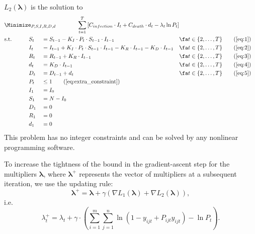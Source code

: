\documentclass{article}
\begin{document}
\begin{minipage}{\linewidth}
{
    $L_2(\bm{\lambda})$ is the solution to\\
    \small
    \begin{alignat}{4}
        &\Minimize_{P,S,I,R,D,d}\qquad \span\span\span\span\span \sum_{t=1}^{T}\left[C_{infection}\cdot I_t + C_{death} \cdot d_t -\lambda_t \ln P_t\right]\nonumber\\
        & \text{s.t.} \qquad&& S_t &&= S_{t-1} - K_I \cdot P_t \cdot S_{t-1} \cdot I_{t-1} && \fa t \in \{2,\ldots,T\} \tag{\ref{eq:1}}\\
        & {} && I_t &&= I_{t-1} + K_I \cdot P_t \cdot S_{t-1} \cdot I_{t-1} - K_R\cdot I_{t-1} - K_D \cdot I_{t-1} && \fa t \in \{2,\ldots,T\} \tag{\ref{eq:2}}\\
        & {} && R_t &&= R_{t-1} + K_R \cdot I_{t-1} && \fa t \in \{2,\ldots,T\} \tag{\ref{eq:3}}\\
        & {} && d_t &&= K_D \cdot I_{t-1} && \fa t \in \{2,\ldots,T\} \tag{\ref{eq:4}}\\
        & {} && D_t &&= D_{t-1} + d_t && \fa t \in \{2,\ldots,T\} \tag{\ref{eq:5}}\\
        & && P_t &&\le 1 \tag{\ref{eq:extra_constraint}}\\
        & {} && I_1 &&= I_0 && \nonumber\\
        & {} && S_1 &&= N - I_0 && \nonumber\\
        & {} && D_1 &&= 0 && \nonumber\\
        & {} && R_1 &&= 0 && \nonumber\\
        & {} && d_1 &&= 0 && \nonumber
    \end{alignat}
}
This problem has no integer constraints and can be solved by any nonlinear programming software.
\end{minipage}

To increase the tightness of the bound in the gradient-ascent step for the multipliers $\bm{\lambda}$, where $\bm{\lambda}^+$ represents the vector of multipliers at a subsequent iteration, we use the updating rule:
\[
    \bm{\lambda}^+ = \bm{\lambda} + \gamma \left(\nabla L_1(\bm{\lambda}) + \nabla L_2(\bm{\lambda})\right),
\]
i.e.
\begin{equation}\label{eq:lambda_update}
    \lambda_t^+ = \lambda_t + \gamma \cdot  \left(\sum_{i=1}^{m}\sum_{j=1}^{n} \ln (1-y_{ijt} + P_{ijt} y_{ijt})- \ln P_t\right).
\end{equation}
\end{document}
